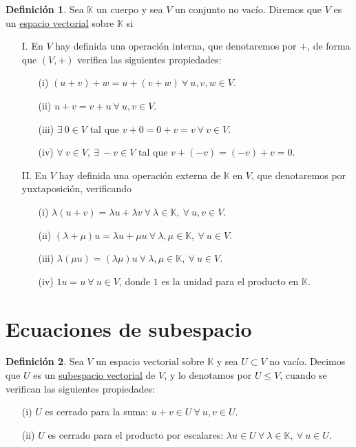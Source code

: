 \documentclass[12pt]{report}
\theoremstyle{definition}
\newtheorem{definition}{Definición}[chapter]
\theoremstyle{definition}
\theoremstyle{remark}
\begin{document}
\begin{definition}
Sea $\mathbb K$ un cuerpo y sea $V$ un conjunto no vacío. Diremos que $V$ es un \ul{espacio vectorial} sobre $\mathbb K$ si
\begin{itemize}
    \item[I.] En $V$ hay definida una operación interna, que denotaremos por $+$, de forma que $(V,+)$ verifica las siguientes propiedades:
    \begin{itemize}
        \item[(i)] $(u+v)+w=u+(v+w) \ \forall \  u,v,w \in V$.
        \item[(ii)] $u+v=v+u \ \forall \  u,v \in V$.
        \item[(iii)] $\exists \ 0 \in V$ tal que $v+0=0+v=v \ \forall \ v \in V$.
        \item[(iv)] $\forall \  v \in V,\  \exists \ -v \in V$ tal que $v+(-v)=(-v)+v=0$.
    \end{itemize}
    \item[II.] En $V$ hay definida una operación externa de $\mathbb K$ en $V$, que denotaremos por yuxtaposición, verificando
    \begin{itemize}
        \item[(i)] $\lambda(u+v)=\lambda u+\lambda v \ \forall \ \lambda \in \mathbb K, \ \forall \ u,v \in V$.
        \item[(ii)] $(\lambda+\mu)u=\lambda u + \mu u \ \forall \ \lambda,\mu \in \mathbb K, \ \forall \ u \in V$.
        \item[(iii)] $\lambda(\mu u)=(\lambda \mu)u \ \forall \ \lambda,\mu \in \mathbb K, \ \forall \ u \in V$.
        \item[(iv)] $1 u = u \ \forall \ u \in V$, donde $1$ es la unidad para el producto en $\mathbb K$.
    \end{itemize}
\end{itemize}
\end{definition}

\section{Ecuaciones de subespacio}

\begin{definition}
Sea $V$ un espacio vectorial sobre $\mathbb K$ y sea $U \subset V$ no vacío. Decimos que $U$ es un \ul{subespacio vectorial} de $V$, y lo denotamos por $U \leq V$, cuando se verifican las siguientes propiedades:
\begin{itemize}
    \item[(i)] $U$ es cerrado para la suma: $u+v \in U \ \forall \ u,v \in U$.
    \item[(ii)] $U$ es cerrado para el producto por escalares: $\lambda u \in U \ \forall \ \lambda \in \mathbb K, \ \forall \ u \in U$.
\end{itemize}
\end{definition}
\end{document}
